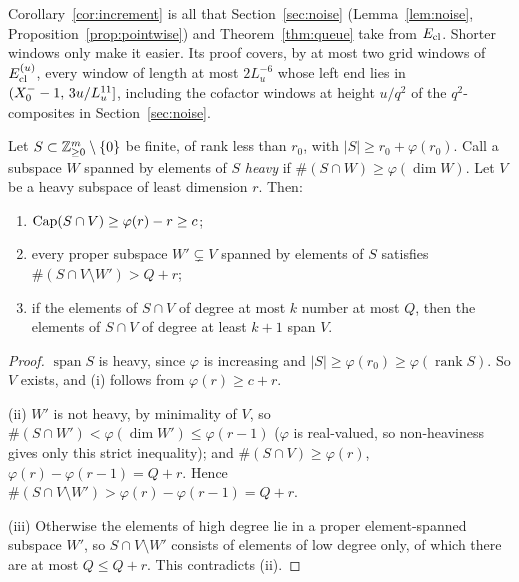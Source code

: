 \begin{remark}\label{rem:increment-uses}
Corollary~\ref{cor:increment} is all that Section~\ref{sec:noise} (Lemma~\ref{lem:noise}, Proposition~\ref{prop:pointwise}) and Theorem~\ref{thm:queue} take from
$E_{\mathrm{cl}}$. Shorter windows only make it easier. Its proof covers, by at most two grid windows of $E_{\mathrm{cl}}^{(u)}$, every window of
length at most $2L_u^{-6}$ whose left end lies in $(X_0^{-}-1,\,3u/L_u^{11}]$, including the cofactor windows at height $u/q^2$ of
the $q^2$-composites in Section~\ref{sec:noise}.
\end{remark}

\begin{lemma}\label{lem:heavy}
Let $S\subset\mathbb{Z}^m_{\ge0}\setminus\{0\}$ be finite, of rank less than $r_0$, with $|S|\ge r_0+\varphi(r_0)$. Call a subspace
$W$ spanned by elements of $S$ \emph{heavy} if $\#(S\cap W)\ge\varphi(\dim W)$. Let $V$ be a heavy subspace of least
dimension $r$. Then:
\begin{enumerate}[label=\textup{(\roman*)}]
\item $\operatorname{Cap}(S\cap V)\ge\varphi(r)-r\ge c$;
\item every proper subspace $W'\subsetneq V$ spanned by elements of $S$ satisfies $\#(S\cap V\setminus W')>Q+r$;
\item if the elements of $S\cap V$ of degree at most $k$ number at most $Q$, then the elements of $S\cap V$ of degree at
  least $k+1$ span $V$.
\end{enumerate}
\end{lemma}

\begin{proof}
$\operatorname{span}S$ is heavy, since $\varphi$ is increasing and $|S|\ge\varphi(r_0)\ge\varphi(\operatorname{rank}S)$. So
$V$ exists, and (i) follows from $\varphi(r)\ge c+r$.

(ii) $W'$ is not heavy, by minimality of $V$, so $\#(S\cap W')<\varphi(\dim W')\le\varphi(r-1)$ ($\varphi$ is real-valued, so
non-heaviness gives only this strict inequality); and $\#(S\cap V)\ge\varphi(r)$, $\varphi(r)-\varphi(r-1)=Q+r$. Hence
$\#(S\cap V\setminus W')>\varphi(r)-\varphi(r-1)=Q+r$.

(iii) Otherwise the elements of high degree lie in a proper element-spanned subspace $W'$, so $S\cap V\setminus W'$
consists of elements of low degree only, of which there are at most $Q\le Q+r$. This contradicts (ii).
\end{proof}

